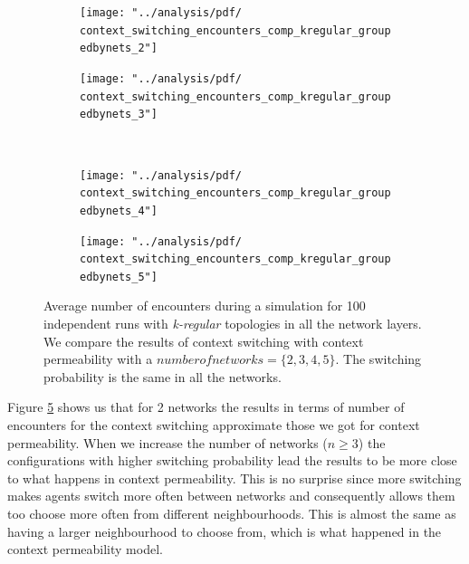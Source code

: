 \documentclass[preprint,number]{elsarticle}
\begin{document}
\begin{figure}[H]
	\centering
	\begin{subfigure}{.49\linewidth}
		\centering
		\texttt{[image: "../analysis/pdf/ context\_switching\_encounters\_comp\_kregular\_groupedbynets\_2"]}
		\caption{}
		\label{fig:ctx_switching_comp_kreg_2}
	\end{subfigure}%
	\begin{subfigure}{.5\linewidth}
		\centering
		\texttt{[image: "../analysis/pdf/ context\_switching\_encounters\_comp\_kregular\_groupedbynets\_3"]}
		\caption{}
		\label{fig:ctx_switching_comp_kreg_3}
	\end{subfigure}\\
	\begin{subfigure}{.49\linewidth}
		\centering
		\texttt{[image: "../analysis/pdf/ context\_switching\_encounters\_comp\_kregular\_groupedbynets\_4"]}
		\caption{}
		\label{fig:ctx_switching_comp_kreg_4}
	\end{subfigure}
	\begin{subfigure}{.5\linewidth}
		\centering
		\texttt{[image: "../analysis/pdf/ context\_switching\_encounters\_comp\_kregular\_groupedbynets\_5"]}
		\caption{}
		\label{fig:ctx_switching_comp_kreg_5}
	\end{subfigure}
	\begin{minipage}{0.9\textwidth}
		\vspace{0.2cm}
		\caption{Average number of encounters during a simulation for 100 independent runs with \textit{k-regular} topologies in all the network layers. We compare the results of context switching with context permeability with a $number of networks = \{2,3,4,5\}$. The switching probability is the same in all the networks. }
		\label{fig:ctx_switching_comp_kreg}
	\end{minipage}
\end{figure}

Figure \ref{fig:ctx_switching_comp_kreg} shows us that for 2 networks the results in terms of number of encounters for the context switching approximate those we got for context permeability. When we increase the number of networks ($n\ge3$) the configurations with higher switching probability lead the results to be more close to what happens in context permeability. This is no surprise since more switching makes agents switch more often between networks and consequently allows them too choose more often from different neighbourhoods. This is almost the same as having a larger neighbourhood to choose from, which is what happened in the context permeability model. 
\end{document}
